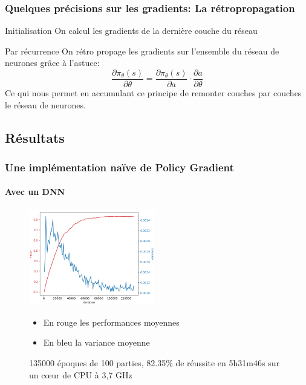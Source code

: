 \documentclass[8pt]{beamer}
\begin{document}
\begin{frame}
  \frametitle{Quelques précisions sur les gradients: La rétropropagation}

  \begin{block}{Initialisation}
    On calcul les gradients de la dernière couche du réseau 
  \end{block}

  \begin{block}{Par récurrence}
      On rétro propage les gradients sur l'ensemble du réseau de neurones grâce à l'astuce:
      \[\frac{\partial \pi_{\theta}(s)}{\partial \theta} = \frac{\partial \pi_{\theta}(s)}{\partial a} \cdot \frac{\partial a}{\partial \theta} \]
      Ce qui nous permet en accumulant ce principe de remonter couches par couches le réseau de neurones.
  \end{block}
\end{frame}

\subsection{Résultats}

\begin{frame}
  \frametitle{Une implémentation naïve de Policy Gradient}
  \framesubtitle{Avec un DNN}

  \begin{figure}
    \begin{minipage}[c]{.55\linewidth}
      \centering
      \includegraphics[width=55mm]{parameters_3-5h31m46s.png}
      \caption{135000 époques de 100 parties, 82.35\% de réussite en 5h31m46s sur un cœur de CPU à 3,7 GHz}
    \end{minipage}
    \hfill%
    \begin{minipage}[c]{.40\linewidth}
      \centering
      \begin{itemize}
      \item En {\color{red}rouge} les performances moyennes  \break
      \item En {\color{blue}bleu} la variance moyenne \break
      \end{itemize}
    \end{minipage}
  \end{figure}

\end{frame}
\end{document}
